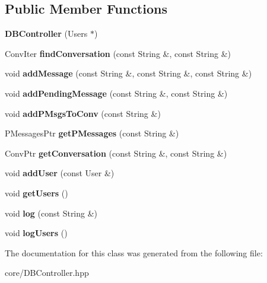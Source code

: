 \subsection*{Public Member Functions}
\begin{DoxyCompactItemize}
\item 
{\bfseries D\+B\+Controller} (Users $\ast$)\hypertarget{classDBController_a96ee1afe79accb438be3c8c7d6153e48}{}\label{classDBController_a96ee1afe79accb438be3c8c7d6153e48}

\item 
Conv\+Iter {\bfseries find\+Conversation} (const String \&, const String \&)\hypertarget{classDBController_a440d0822dc8783d0bd1e0c9abaa9dda3}{}\label{classDBController_a440d0822dc8783d0bd1e0c9abaa9dda3}

\item 
void {\bfseries add\+Message} (const String \&, const String \&, const String \&)\hypertarget{classDBController_a7cabcbb8b0929fb216ce578c92ba60d6}{}\label{classDBController_a7cabcbb8b0929fb216ce578c92ba60d6}

\item 
void {\bfseries add\+Pending\+Message} (const String \&, const String \&)\hypertarget{classDBController_a53d1d7eb7bec56a9c8947d3d3933a2dd}{}\label{classDBController_a53d1d7eb7bec56a9c8947d3d3933a2dd}

\item 
void {\bfseries add\+P\+Msgs\+To\+Conv} (const String \&)\hypertarget{classDBController_a50e7d50c550c5a99e2fbe16dbbd663cb}{}\label{classDBController_a50e7d50c550c5a99e2fbe16dbbd663cb}

\item 
P\+Messages\+Ptr {\bfseries get\+P\+Messages} (const String \&)\hypertarget{classDBController_ac714342c2231148d74a38d6ffbf3bc6c}{}\label{classDBController_ac714342c2231148d74a38d6ffbf3bc6c}

\item 
Conv\+Ptr {\bfseries get\+Conversation} (const String \&, const String \&)\hypertarget{classDBController_ae470582ad606464b6bfa1e083e636331}{}\label{classDBController_ae470582ad606464b6bfa1e083e636331}

\item 
void {\bfseries add\+User} (const User \&)\hypertarget{classDBController_ab58344200efef52f4af29ba0719d6a04}{}\label{classDBController_ab58344200efef52f4af29ba0719d6a04}

\item 
void {\bfseries get\+Users} ()\hypertarget{classDBController_a8f20b4a461adf6112d8c18d4525d212a}{}\label{classDBController_a8f20b4a461adf6112d8c18d4525d212a}

\item 
void {\bfseries log} (const String \&)\hypertarget{classDBController_a4c6877eb395a74ced68d336a461209f5}{}\label{classDBController_a4c6877eb395a74ced68d336a461209f5}

\item 
void {\bfseries log\+Users} ()\hypertarget{classDBController_aa6fb5d37c63368f79193bb548f8823b9}{}\label{classDBController_aa6fb5d37c63368f79193bb548f8823b9}

\end{DoxyCompactItemize}


The documentation for this class was generated from the following file\+:\begin{DoxyCompactItemize}
\item 
core/D\+B\+Controller.\+hpp\end{DoxyCompactItemize}
